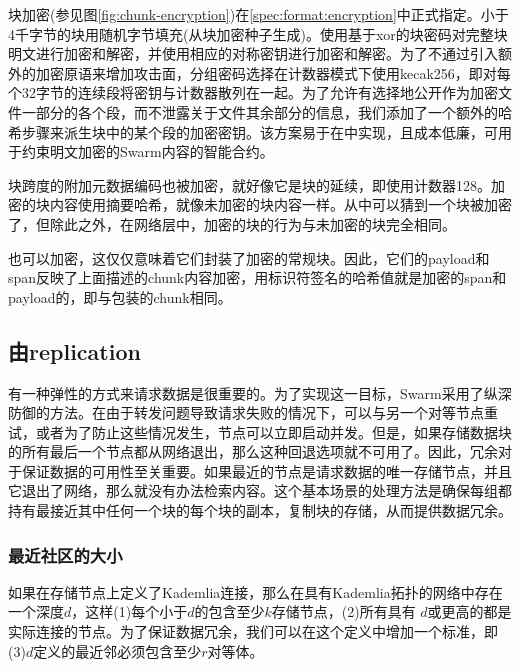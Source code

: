 块加密(参见图\ref{fig:chunk-encryption})在\ref{spec:format:encryption}中正式指定。小于4千字节的块用随机字节填充(从块加密种子生成)。使用基于xor的块密码对完整块明文进行加密和解密，并使用相应的对称密钥进行加密和解密。为了不通过引入额外的加密原语来增加攻击面，分组密码选择在计数器模式下使用kecak256，即对每个32字节的连续段将密钥与计数器散列在一起。为了允许有选择地公开作为加密文件一部分的各个段，而不泄露关于文件其余部分的信息，我们添加了一个额外的哈希步骤来派生块中的某个段的加密密钥。该方案易于在中实现，且成本低廉，可用于约束明文加密的Swarm内容的智能合约。 

块跨度的附加元数据编码也被加密，就好像它是块的延续，即使用计数器128。加密的块内容使用摘要哈希，就像未加密的块内容一样。从中可以猜到一个块被加密了，但除此之外，在网络层中，加密的块的行为与未加密的块完全相同。

也可以加密，这仅仅意味着它们封装了加密的常规块。因此，它们的payload和span反映了上面描述的chunk内容加密，用标识符签名的哈希值就是加密的span和payload的，即与包装的chunk相同。

\subsection{由replication}\label{sec:redundancy-by-local-replication}

有一种弹性的方式来请求数据是很重要的。为了实现这一目标，Swarm采用了纵深防御的方法。在由于转发问题导致请求失败的情况下，可以与另一个对等节点重试，或者为了防止这些情况发生，节点可以立即启动并发。但是，如果存储数据块的所有最后一个节点都从网络退出，那么这种回退选项就不可用了。因此，冗余对于保证数据的可用性至关重要。如果最近的节点是请求数据的唯一存储节点，并且它退出了网络，那么就没有办法检索内容。这个基本场景的处理方法是确保每组都持有最接近其中任何一个块的每个块的副本，复制块的存储，从而提供数据冗余。 

\subsubsection{最近社区的大小}

如果在存储节点上定义了Kademlia连接，那么在具有Kademlia拓扑的网络中存在一个深度$d$，这样(1)每个小于$d$的包含至少$k$存储节点，(2)所有具有 $d$或更高的都是实际连接的节点。为了保证数据冗余，我们可以在这个定义中增加一个标准，即(3)$d$定义的最近邻必须包含至少$r$对等体。

